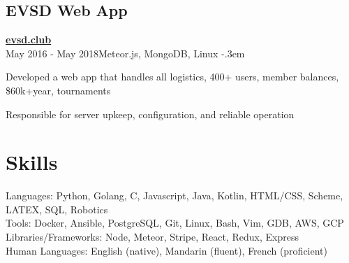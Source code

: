 \documentclass{article}
\let\olditemize=\itemize \let\endolditemize=\enditemize
\renewenvironment{itemize}{\olditemize[topsep=0em] \itemsep-.3em}{\endolditemize}
\newcommand{\link}[1]{\href{https://#1}{#1}}
\newcommand{\entry}[3]{\quad\textbf{#1}\\#2\qquad#3}
\begin{document}
\subsection{EVSD Web App}
\entry{\link{evsd.club}}{May 2016 - May 2018}{Meteor.js, MongoDB, Linux}
\begin{itemize}
  \item Developed a web app that handles all logistics, 400+ users, member balances,
    \$60k+year, tournaments
  \item Responsible for server upkeep, configuration, and reliable operation
\end{itemize}


\section{Skills}
Languages:
  Python, Golang, C, Javascript, Java, Kotlin, HTML/CSS, Scheme, LATEX, SQL, Robotics \\
Tools:
  Docker, Ansible, PostgreSQL, Git, Linux, Bash, Vim, GDB, AWS, GCP \\
Libraries/Frameworks:
  Node, Meteor, Stripe, React, Redux, Express \\
Human Languages:
  English (native), Mandarin (fluent), French (proficient)
\end{document}
